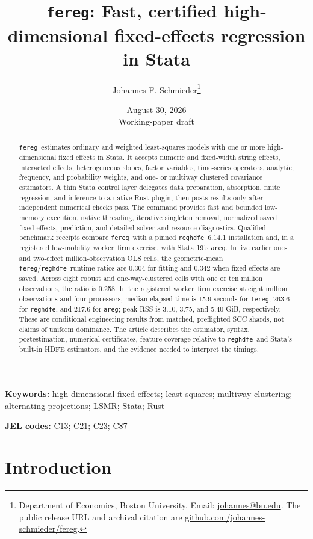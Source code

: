 \documentclass[11pt]{article}
\title{\texttt{fereg}: Fast, certified high-dimensional fixed-effects
regression in Stata}
\author{Johannes F. Schmieder\thanks{Department of Economics, Boston
University. Email: \href{mailto:johannes@bu.edu}{johannes@bu.edu}.
The public release URL and archival citation are
\href{https://github.com/johannes-schmieder/fereg}
{github.com/johannes-schmieder/fereg}\tbu.}}
\date{August 30, 2026\\[0.5em]\small Working-paper draft}
\newcommand{\fereg}{\texttt{fereg}}
\newcommand{\reghdfe}{\texttt{reghdfe}}
\newcommand{\areg}{\texttt{areg}}
\begin{document}
\maketitle

\begin{abstract}
\noindent
\fereg\ estimates ordinary and weighted least-squares models with one or
more high-dimensional fixed effects in Stata.  It accepts numeric and
fixed-width string effects, interacted effects, heterogeneous slopes, factor
variables, time-series operators, analytic, frequency, and probability
weights, and one- or multiway clustered covariance estimators.  A thin Stata
control layer delegates data preparation, absorption, finite regression, and
inference to a native Rust plugin, then posts results only after independent
numerical checks pass.  The command provides fast and bounded low-memory
execution, native threading, iterative singleton removal, normalized saved
fixed effects, prediction, and detailed solver and resource diagnostics.
Qualified benchmark receipts compare \fereg\ with a pinned \reghdfe\ 6.14.1
installation and, in a registered low-mobility worker--firm exercise, with
Stata 19's \areg.  In five earlier one- and two-effect
million-observation OLS cells, the geometric-mean
\fereg/\reghdfe\ runtime ratios are 0.304 for fitting and 0.342 when fixed
effects are saved.  Across eight robust and one-way-clustered cells with one
or ten million observations, the ratio is 0.258.  In the registered
worker--firm exercise at eight million observations and four processors,
median elapsed time is 15.9 seconds for \fereg, 263.6 for \reghdfe, and 217.6
for \areg; peak RSS is 3.10, 3.75, and 5.40 GiB, respectively.  These are conditional
engineering results from matched, preflighted SCC shards, not claims of
uniform dominance.  The article describes the estimator, syntax,
postestimation, numerical certificates, feature coverage relative to
\reghdfe\ and Stata's built-in HDFE estimators, and the evidence needed to
interpret the timings.
\end{abstract}

\noindent\textbf{Keywords:} high-dimensional fixed effects; least squares;
multiway clustering; alternating projections; LSMR; Stata; Rust

\noindent\textbf{JEL codes:} C13; C21; C23; C87

\clearpage

\section{Introduction}
\label{sec:introduction}
\end{document}

